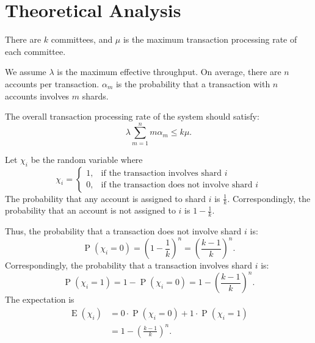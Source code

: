 \documentclass[10pt, conference, letterpaper]{IEEEtran}
\begin{document}
\section{Theoretical Analysis}
There are $k$ committees,  and $\mu$ is the maximum transaction processing rate of each committee.

We assume $\lambda$ is the maximum effective throughput. 
On average, there are  $n$ accounts per transaction. $\alpha_{m}$ is the probability that a transaction with $n$ accounts involves $m$ shards. 

The overall transaction processing rate of the system should satisfy:
\begin{equation} \label{equ1}
	\lambda \sum_{m=1}^n m \alpha_{m} \le k\mu. 	
\end{equation}


Let $ \chi_i$ be the random variable where
\begin{equation}
	\chi_i=
	\begin{cases} 
		1, & \mbox{if the transaction involves  shard $i$}          \\
		0, & \mbox{if the transaction does not involve   shard $i$}
	\end{cases}
\end{equation}
The probability that any account is assigned to shard $i$ is $\frac{1}{k}$. Correspondingly, the probability that an account is not assigned to $i$ is $1-\frac{1}{k}$. 

Thus, the probability that a transaction does not involve shard $i$ is:
\begin{equation}
	\operatorname{P}( \chi_i=0)=\left(1-\frac{1}{k}\right)^n=\left(\frac{k-1}{k}\right)^n.
\end{equation}
Correspondingly, the probability that a transaction involves shard $i$ is:
\begin{equation}
	\operatorname{P}( \chi_i=1)=1-\operatorname{P}( \chi_i=0)=1-\left(\frac{k-1}{k}\right)^n.
\end{equation}
The expectation is
\begin{equation}
	\begin{split}
		\operatorname{E}( \chi_i )&= 0\cdot \operatorname{P}( \chi_i=0)+1 \cdot \operatorname{P}( \chi_i=1)\\
		&=1-\left(\frac{k-1}{k}\right)^n.
	\end{split}
\end{equation}
\end{document}
